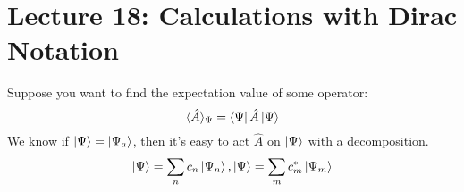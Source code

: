 \section{Lecture 18: Calculations with Dirac Notation}

Suppose you want to find the expectation value of some operator:
\[ \langle \hat{A} \rangle_{\Psi} = \bra{\Psi} \hat{A} \ket{\Psi} \]
We know if $\ket{\Psi} = \ket{\Psi_a}$, then it's easy to act $\hat{A}$ on
$\ket{\Psi}$ with a decomposition.
\[ \ket{\Psi} = \sum_n c_n \ket{\Psi_n}, \ket{\Psi} = \sum_m c_m^* \ket{\Psi_m} \]